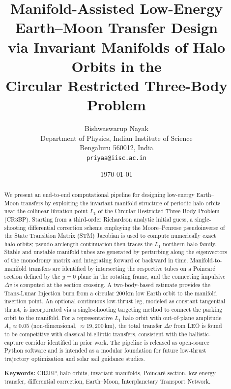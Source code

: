 \documentclass[12pt, a4paper]{article}
\newcommand{\Az}{A_z}
\begin{document}
\title{%
  Manifold-Assisted Low-Energy Earth--Moon Transfer Design\\
  via Invariant Manifolds of Halo Orbits in the\\
  Circular Restricted Three-Body Problem%
}

\author{%
  Bishwaswarup Nayak\\[4pt]
  \small Department of Physics, Indian Institute of Science\\
  \small Bengaluru 560012, India\\
  \small \texttt{priyaa@iisc.ac.in}
}

\date{\today}
\maketitle

\begin{abstract}
\noindent
We present an end-to-end computational pipeline for designing low-energy
Earth--Moon transfers by exploiting the invariant manifold structure of
periodic halo orbits near the collinear libration point $L_1$ of the Circular
Restricted Three-Body Problem (CR3BP).
%
Starting from a third-order Richardson analytic initial guess, a
single-shooting differential correction scheme employing the Moore--Penrose
pseudoinverse of the State Transition Matrix (STM) Jacobian is used to
compute numerically exact halo orbits; pseudo-arclength continuation then
traces the $L_1$ northern halo family.
%
Stable and unstable manifold tubes are generated by perturbing along the
eigenvectors of the monodromy matrix and integrating forward or backward
in time.
%
Manifold-to-manifold transfers are identified by intersecting the
respective tubes on a Poincaré section defined by the $y=0$ plane in the
rotating frame, and the connecting impulsive $\Delta v$ is computed at
the section crossing.
%
A two-body-based estimate provides the Trans-Lunar Injection burn from a
circular 200\,km low Earth orbit to the manifold insertion point.
%
An optional continuous low-thrust leg, modeled as constant tangential
thrust, is incorporated via a single-shooting targeting method to connect
the parking orbit to the manifold.
%
For a representative $L_1$ halo orbit with out-of-plane amplitude
$\Az \approx 0.05$ (non-dimensional, $\approx 19{,}200$\,km), the total
transfer $\Delta v$ from LEO is found to be competitive with classical
bi-elliptic transfers, consistent with the ballistic-capture corridor
identified in prior work.
%
The pipeline is released as open-source Python software and is intended as a
modular foundation for future low-thrust trajectory optimization and solar
sail guidance studies.

\medskip\noindent\textbf{Keywords:}
CR3BP, halo orbits, invariant manifolds, Poincaré section,
low-energy transfer, differential correction, Earth--Moon,
Interplanetary Transport Network.
\end{abstract}
\end{document}
